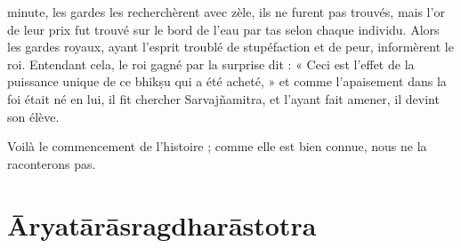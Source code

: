 \documentclass[a4paper, 11pt, oneside, french]{article}
\begin{document}
minute, les gardes les recherchèrent avec zèle, ils ne furent pas trouvés, mais l'or de leur prix fut trouvé sur le bord de l'eau par tas selon chaque individu. Alors les gardes royaux, ayant l'esprit troublé de stupéfaction et de peur, informèrent le roi. Entendant cela, le roi gagné par la surprise dit : « Ceci est l'effet de la puissance unique de ce bhik\d{s}u qui a été acheté, » et comme l'apaisement dans la foi était né en lui, il fit chercher Sarvaj\~{n}amitra, et l'ayant fait amener, il devint son élève.

Voilà le commencement de l'histoire ; comme elle est bien connue, nous ne la raconterons pas.
\clearpage
\section{\={A}ryat\={a}r\={a}sragdhar\={a}stotra}
\end{document}

